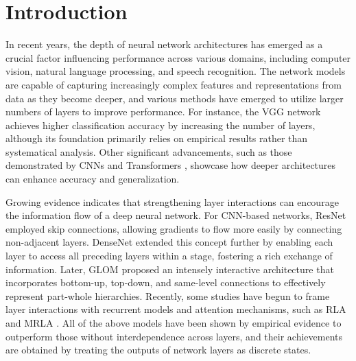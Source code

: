 \section{Introduction}
\label{Introduction}

In recent years, the depth of neural network architectures has emerged as a crucial factor influencing performance across various domains, including computer vision, natural language processing, and speech recognition.
The network models are capable of capturing increasingly complex features and representations from data as they become deeper, and various methods have emerged to utilize larger numbers of layers to improve performance. 
For instance, the VGG network \citep{simonyan2015deepconvolutionalnetworkslargescale} achieves higher classification accuracy by increasing the number of layers, although its foundation primarily relies on empirical results rather than systematical analysis. Other significant advancements, such as those demonstrated by CNNs \citep{he2016deep, ren2016faster, tan2020efficientnetrethinkingmodelscaling} and Transformers \citep{brown2020language, dosovitskiy2020image, touvron2021training, liu2021swin, wang2022pvt}, showcase how deeper architectures can enhance accuracy and generalization. 

Growing evidence indicates that strengthening layer interactions can encourage the information flow of a deep neural network.
%
For CNN-based networks, ResNet \citep{he2016deep} employed skip connections, allowing gradients to flow more easily by connecting non-adjacent layers. 
DenseNet \citep{huang2018denselyconnectedconvolutionalnetworks} extended this concept further by enabling each layer to access all preceding layers within a stage, fostering a rich exchange of information. 
Later, GLOM \citep{hinton2023represent} proposed an intensely interactive architecture that incorporates bottom-up, top-down, and same-level connections to effectively represent part-whole hierarchies. 
%
Recently, some studies have begun to frame layer interactions with recurrent models and attention mechanisms, such as RLA \citep{zhao2021recurrence} and MRLA \citep{fang2023cross}. 
%
All of the above models have been shown by empirical evidence to outperform those without interdependence across layers, and their achievements are obtained by treating the outputs of network layers as discrete states. 

